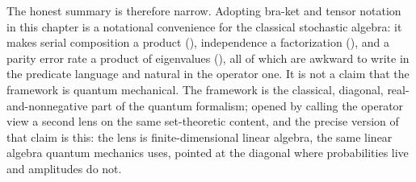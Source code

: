 The honest summary is therefore narrow. Adopting bra-ket and tensor notation in
this chapter is a notational convenience for the classical stochastic algebra:
it makes serial composition a product (),
independence a factorization (), and a parity
error rate a product of eigenvalues (), all of which
are awkward to write in the predicate language and natural in the operator one.
It is not a claim that the framework is quantum mechanical. The framework is the
classical, diagonal, real-and-nonnegative part of the quantum formalism;
 opened by calling the operator view a second lens
on the same set-theoretic content, and the precise version of that claim is this:
the lens is finite-dimensional linear algebra, the same linear algebra quantum
mechanics uses, pointed at the diagonal where probabilities live and amplitudes
do not.
